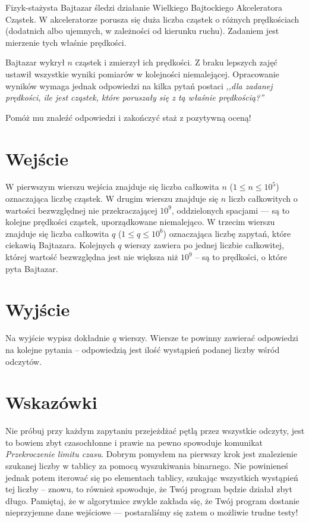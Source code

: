 \documentclass{spiral-kurs}
\begin{document}
\makeheader
%
Fizyk-stażysta Bajtazar śledzi działanie Wielkiego Bajtockiego Akceleratora Cząstek. W akceleratorze porusza się duża liczba cząstek o różnych prędkościach (dodatnich albo ujemnych, w zależności od kierunku ruchu).
Zadaniem jest mierzenie tych właśnie prędkości.

Bajtazar wykrył $n$ cząstek i zmierzył ich prędkości. Z braku lepszych zajęć ustawił wszystkie wyniki pomiarów w kolejności niemalejącej.
Opracowanie wyników wymaga jednak odpowiedzi na kilka pytań postaci {\it ,,dla zadanej prędkości, ile jest cząstek, które poruszały się z tą właśnie prędkością?'' }

Pomóż mu znaleźć odpowiedzi i zakończyć staż z pozytywną oceną!

   \section{Wejście}
W pierwszym wierszu wejścia znajduje się liczba całkowita $n$ ($1 \leq n \leq
10^5$) oznaczająca liczbę cząstek. W drugim wierszu
znajduje się $n$ liczb całkowitych o wartości bezwzględnej nie
przekraczającej $10^9$, oddzielonych spacjami --- są to
kolejne prędkości cząstek, uporządkowane niemalejąco.
W trzecim wierszu znajduje się liczba całkowita $q$ ($1 \leq q \leq 10^6$) oznaczająca liczbę
zapytań, które ciekawią Bajtazara. Kolejnych $q$ wierszy zawiera po jednej liczbie całkowitej,
której wartość bezwzględna jest nie większa niż $10^9$ -- są to prędkości, o które pyta Bajtazar.


  \section{Wyjście}
Na wyjście wypisz dokładnie $q$ wierszy. Wiersze te powinny zawierać odpowiedzi na kolejne pytania -- odpowiedzią jest ilość wystąpień podanej liczby wśród odczytów.

\section{Wskazówki}
Nie próbuj przy każdym zapytaniu przejeżdżać pętlą przez wszystkie odczyty, jest to bowiem zbyt czasochłonne i prawie na pewno spowoduje komunikat {\it Przekroczenie limitu czasu}.
Dobrym pomysłem na pierwszy krok jest znalezienie szukanej liczby w tablicy za pomocą wyszukiwania binarnego. Nie powinieneś jednak potem iterować się po elementach tablicy, szukając wszystkich wystąpień tej liczby -- znowu, to również spowoduje, że Twój program będzie działał zbyt długo.
Pamiętaj, że w algorytmice zwykle zakłada się, że Twój program dostanie nieprzyjemne dane wejściowe --- postaraliśmy się zatem o możliwie trudne testy!



  
\end{document}
